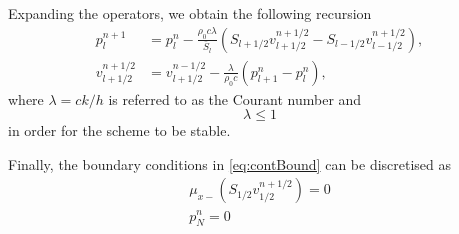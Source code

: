 Expanding the operators, we obtain the following recursion
\begin{subequations}\label{eq:updateNormal}
    \begin{align}
        p_l^{n+1} &= p_l^n - \frac{\rho_0 c \lambda}{\bar{S}_l}(S_{l+1/2}v_{l+1/2}^{n+1/2}-S_{l-1/2}v_{l-1/2}^{n+1/2}),\label{eq:pressureUpdate}\\
        v_{l+1/2}^{n+1/2} &= v_{l+1/2}^{n-1/2}-\frac{\lambda}{\rho_0 c}(p_{l+1}^n - p_l^n),\label{eq:velocityUpdate}
    \end{align}
\end{subequations}
where $\lambda = ck/h$ is referred to as the Courant number and
\begin{equation}\label{eq:CFL}
    \lambda \leq 1
\end{equation}
in order for the scheme to be stable. 

Finally, the boundary conditions in \eqref{eq:contBound} can be discretised as
\begin{subequations}
    \begin{align}
        \mu_{x-}\left(S_{1/2}v_{1/2}^{n+1/2}\right) = 0\label{eq:discNeumann}\\
        p_N^n = 0\label{eq:discDirich}
    \end{align}    
\end{subequations}

